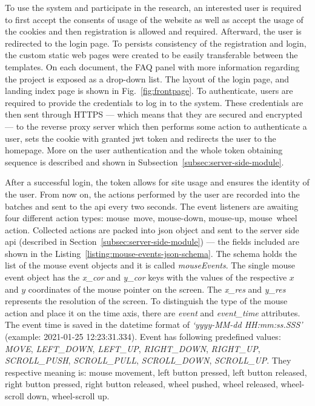 To use the system and participate in the research, an interested user is required to first accept the consents of usage of the website as well as accept the usage of the cookies and then registration is allowed and required. Afterward, the user is redirected to the login page.
To persists consistency of the registration and login, the custom static web pages were created to be easily transferable between the templates.
On each document, the FAQ panel with more information regarding the project is exposed as a drop-down list.
The layout of the login page, and landing index page is shown in Fig.~\ref{fig:frontpage}.
To authenticate, users are required to provide the credentials to log in to the system.
These credentials are then sent through HTTPS --- which means that they are secured and encrypted --- to the reverse proxy server which then performs some action to authenticate a user, sets the cookie with granted \gls{jwt} token and redirects the user to the homepage.
More on the user authentication and the whole token obtaining sequence is described and shown in Subsection~\ref{subsec:server-side-module}.

After a successful login, the token allows for site usage and ensures the identity of the user.
From now on, the actions performed by the user are recorded into the batches and sent to the \gls{api} every two seconds.
The event listeners are awaiting four different action types: \mbox{mouse move}, \mbox{mouse-down}, \mbox{mouse-up}, \mbox{mouse wheel} action.
Collected actions are packed into \gls{json} object and sent to the server side \gls{api} (described in Section~\ref{subsec:server-side-module}) --- the fields included are shown in the Listing~\ref{listing:mouse-events-json-schema}.
The schema holds the list of the mouse event objects and it is called \textit{mouseEvents}.
The single mouse event object has the \textit{x\_cor} and \textit{y\_cor} keys with the values of the respective $x$ and $y$ coordinates of the mouse pointer on the screen.
The \textit{x\_res} and \textit{y\_res} represents the resolution of the screen.
To distinguish the type of the mouse action and place it on the time axis, there are \textit{event} and \textit{event\_time} attributes.
The event time is saved in the datetime format of \textit{`yyyy-MM-dd HH:mm:ss.SSS'} (example: 2021-01-25 12:23:31.334).
Event has following predefined values: \textit{MOVE}, \textit{LEFT\_DOWN}, \textit{LEFT\_UP}, \textit{RIGHT\_DOWN}, \textit{RIGHT\_UP}, \textit{SCROLL\_PUSH}, \textit{SCROLL\_PULL}, \textit{SCROLL\_DOWN}, \textit{SCROLL\_UP}\@.
They respective meaning is: mouse movement, left button pressed, left button released, right button pressed, right button released, wheel pushed, wheel released, wheel-scroll down, wheel-scroll up.



